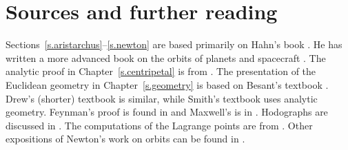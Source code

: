 
\chapter*{Sources and further reading}


Sections~\ref{s.aristarchus}--\ref{s.newton} are based primarily on Hahn's book \cite{hahn-cic}. He has written a more advanced book on the orbits of planets and spacecraft \cite{hahn-orbits}. The analytic proof in Chapter~\ref{s.centripetal} is from \cite{griffiths}. The presentation of the Euclidean geometry in Chapter~\ref{s.geometry} is based on Besant's textbook \cite{besant}. Drew's (shorter) textbook \cite{drew} is similar, while Smith's textbook \cite{smith} uses analytic geometry. Feynman's proof is found in \cite{lost} and Maxwell's is in \cite[Article CXXXIII]{maxwell}. Hodographs are discussed in \cite{hodograph}. The computations of the Lagrange points are from \cite{stern}. Other expositions of Newton's work on orbits can be found in \cite{hauser-lang,stein}. 

\begin{small}


\end{small}
